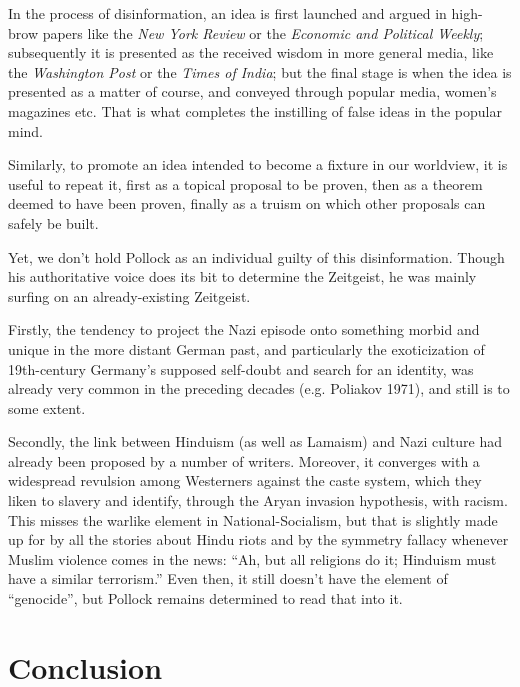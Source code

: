 In the process of disinformation, an idea is first launched and argued in high-brow papers like the {\sl New York Review} or the {\sl Economic and Political Weekly}; subsequently it is presented as the received wisdom in more general media, like the {\sl Washington Post} or the {\sl Times of India}; but the final stage is when the idea is presented as a matter of course, and conveyed through popular media, women’s magazines etc. That is what completes the instilling of false ideas in the popular mind.

Similarly, to promote an idea intended to become a fixture in our worldview, it is useful to repeat it, first as a topical proposal to be proven, then as a theorem deemed to have been proven, finally as a truism on which other proposals can safely be built.

Yet, we don’t hold Pollock as an individual guilty of this disinformation. Though his authoritative voice does its bit to determine the Zeitgeist, he was mainly surfing on an already-existing Zeitgeist.

Firstly, the tendency to project the Nazi episode onto something morbid and unique in the more distant German past, and particularly the exoticization of 19th-century Germany’s supposed self-doubt and search for an identity, was already very common in the preceding decades (e.g. Poliakov 1971), and still is to some extent.

Secondly, the link between Hinduism (as well as Lamaism) and Nazi culture had already been proposed by a number of writers. Moreover, it converges with a widespread revulsion among Westerners against the caste system, which they liken to slavery and identify, through the Aryan invasion hypothesis, with racism. This misses the warlike element in National-Socialism, but that is slightly made up for by all the stories about Hindu riots and by the symmetry fallacy whenever Muslim violence comes in the news: “Ah, but all religions do it; Hinduism must have a similar terrorism.” Even then, it still doesn’t have the element of “genocide”, but Pollock remains determined to read that into it.

\section*{Conclusion}

